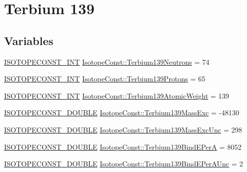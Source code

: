 \hypertarget{group___isotope_const-_terbium-_tb139}{}\section{Terbium 139}
\label{group___isotope_const-_terbium-_tb139}
\subsection*{Variables}
\begin{DoxyCompactItemize}
\item 
\mbox{\hyperlink{group___isotope_const-_macros_ga5f18360b3e99483a35c32d789e62621c}{I\+S\+O\+T\+O\+P\+E\+C\+O\+N\+S\+T\+\_\+\+I\+NT}} \mbox{\hyperlink{group___isotope_const-_terbium-_tb139_ga51de8fb70ca9af4dc95f32034340c250}{Isotope\+Const\+::\+Terbium139\+Neutrons}} = 74
\item 
\mbox{\hyperlink{group___isotope_const-_macros_ga5f18360b3e99483a35c32d789e62621c}{I\+S\+O\+T\+O\+P\+E\+C\+O\+N\+S\+T\+\_\+\+I\+NT}} \mbox{\hyperlink{group___isotope_const-_terbium-_tb139_gaaf4009f77c4c92bd6996372f2d97c5cf}{Isotope\+Const\+::\+Terbium139\+Protons}} = 65
\item 
\mbox{\hyperlink{group___isotope_const-_macros_ga5f18360b3e99483a35c32d789e62621c}{I\+S\+O\+T\+O\+P\+E\+C\+O\+N\+S\+T\+\_\+\+I\+NT}} \mbox{\hyperlink{group___isotope_const-_terbium-_tb139_gabf853bbc95574866bad9fc07b31583da}{Isotope\+Const\+::\+Terbium139\+Atomic\+Weight}} = 139
\item 
\mbox{\hyperlink{group___isotope_const-_macros_ga8f45a7272ce02c0b4c65c44636ed719a}{I\+S\+O\+T\+O\+P\+E\+C\+O\+N\+S\+T\+\_\+\+D\+O\+U\+B\+LE}} \mbox{\hyperlink{group___isotope_const-_terbium-_tb139_ga65c1e9d5417ad0ddfc3ced12ce211a1d}{Isotope\+Const\+::\+Terbium139\+Mass\+Exc}} = -\/48130
\item 
\mbox{\hyperlink{group___isotope_const-_macros_ga8f45a7272ce02c0b4c65c44636ed719a}{I\+S\+O\+T\+O\+P\+E\+C\+O\+N\+S\+T\+\_\+\+D\+O\+U\+B\+LE}} \mbox{\hyperlink{group___isotope_const-_terbium-_tb139_ga3e6c35d1d9d1fd177338bd3df994819d}{Isotope\+Const\+::\+Terbium139\+Mass\+Exc\+Unc}} = 298
\item 
\mbox{\hyperlink{group___isotope_const-_macros_ga8f45a7272ce02c0b4c65c44636ed719a}{I\+S\+O\+T\+O\+P\+E\+C\+O\+N\+S\+T\+\_\+\+D\+O\+U\+B\+LE}} \mbox{\hyperlink{group___isotope_const-_terbium-_tb139_ga98c44dd850b7911a07c63a1a1fb71047}{Isotope\+Const\+::\+Terbium139\+Bind\+E\+PerA}} = 8052
\item 
\mbox{\hyperlink{group___isotope_const-_macros_ga8f45a7272ce02c0b4c65c44636ed719a}{I\+S\+O\+T\+O\+P\+E\+C\+O\+N\+S\+T\+\_\+\+D\+O\+U\+B\+LE}} \mbox{\hyperlink{group___isotope_const-_terbium-_tb139_ga64d32c880c22b0198091831e88ade606}{Isotope\+Const\+::\+Terbium139\+Bind\+E\+Per\+A\+Unc}} = 2

\end{DoxyCompactItemize}
